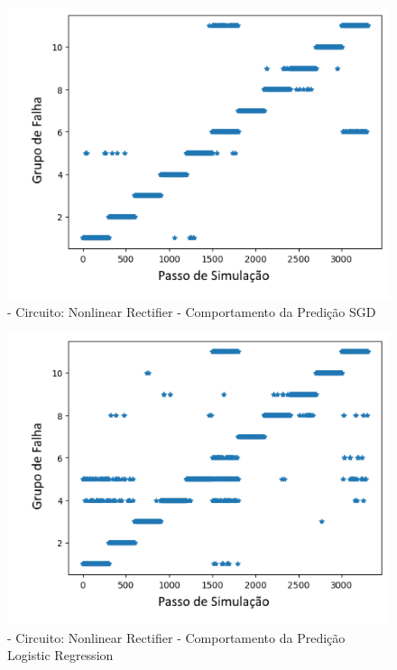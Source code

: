         
        \begin{figure}[H]
        \begin{center}
        \includegraphics[width=13cm]{./01_Pre_textuais/nonlin_figs/SGDClassifier_Nonlinear_Rectfier_+_4bit_PRBS_[FALHA]_-_300_-_02sraw.png}
        \caption{\label{fig:DecisionTreeClassifieSalenkey}- Circuito: Nonlinear Rectifier - Comportamento da Predição SGD}
        \end{center}
        \end{figure}
        
        
        \begin{figure}[H]
        \begin{center}
        \includegraphics[width=13cm]{./01_Pre_textuais/nonlin_figs/LogisticRegression_Nonlinear_Rectfier_+_4bit_PRBS_[FALHA]_-_300_-_02sraw.png}
        \caption{\label{fig:DecisionTreeClassifieSalenkey}- Circuito: Nonlinear Rectifier - Comportamento da Predição Logistic Regression }
        \end{center}
        \end{figure}
        
